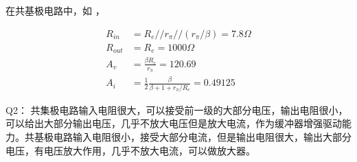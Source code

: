 \documentclass[lang=cn,11pt,a4paper,cite=authoryear]{elegantpaper}
\begin{document}
在共基极电路中，如  ， 

\[\begin{aligned}
    R_{in} &= R_e // r_\pi // (r_\pi / \beta) = 7.8 \Omega\\
    R_{out} &= R_e = 1000 \Omega \\ 
    A_v &= \frac{\beta R_c}{r_\pi}= 120.69 \\ 
    A_i &= \frac{1}{2}\frac{\beta}{\beta + 1 + r_\pi / R_e}  = 0.49125
\end{aligned}\]

Q2： 共集极电路输入电阻很大，可以接受前一级的大部分电压，输出电阻很小，可以给出大部分输出电压，几乎不放大电压但是放大电流，作为缓冲器增强驱动能力。共基极电路输入电阻很小，接受大部分电流，但是输出电阻很大，输出大部分电压，有电压放大作用，几乎不放大电流，可以做放大器。


\end{document}
